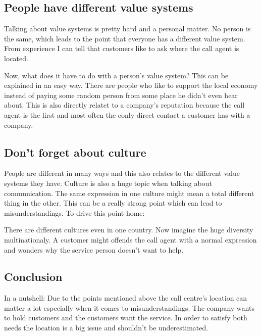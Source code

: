 \documentclass[a4paper,11pt]{scrartcl}%
\begin{document}
	\subsection{People have different value systems}
	Talking about value systems is pretty hard and a personal matter. No person is the same, which leads to the point
	that everyone has a different value system. From experience I can tell that customers like to ask where the call 
	agent is located.\par
	Now, what does it have to do with a person's value system? This can be explained in an easy way. There are people who
	like to support the local economy instead of paying some random person from some place he didn't even hear about.
	This is also directly relatet to a company's reputation because the call agent is the first and most often the conly
	direct contact a customer has with a company.

	\subsection{Don't forget about culture}
	People are different in many ways and this also relates to the different value systems they have. Culture is also 
	a huge topic when talking about communication. The same expression in one culture might mean a total different thing
	in the other. This can be a really strong point which can lead to misunderstandings. To drive this point home:\par
	There are different cultures even in one country. Now imagine the huge diversity multinationaly. A customer might
	offends the call agent with a normal expression and wonders why the service person doesn't want to help.

	\subsection{Conclusion}
	In a nutshell: Due to the points mentioned above the call centre's location can matter a lot especially when it comes
	to misunderstandings. The company wants to hold customers and the customers want the service. In order to satisfy
	both needs the location is a big issue and shouldn't be underestimated.
\end{document}
